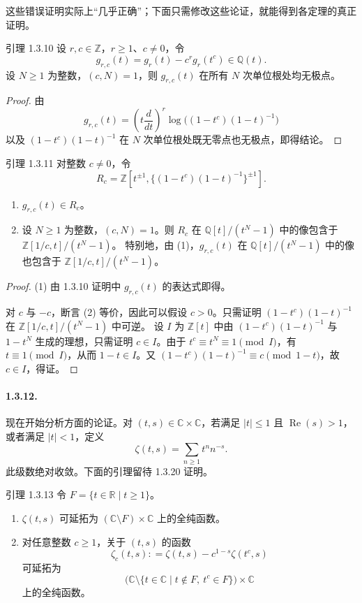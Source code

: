 这些错误证明实际上“几乎正确”；下面只需修改这些论证，就能得到各定理的真正证明。

\begin{statement}{引理 1.3.10}
设 $r,c\in\mathbb Z$，$r\geq1$、$c\ne0$，令
\[
g_{r,c}(t)=g_r(t)-c^rg_r(t^c)\in\mathbb Q(t).
\]
设 $N\geq1$ 为整数，$(c,N)=1$，则 $g_{r,c}(t)$ 在所有 $N$ 次单位根处均无极点。
\end{statement}
\begin{proof}
由
\[
g_{r,c}(t)=\left(t\frac d{dt}\right)^r
\log\bigl((1-t^c)(1-t)^{-1}\bigr)
\]
以及 $(1-t^c)(1-t)^{-1}$ 在 $N$ 次单位根处既无零点也无极点，即得结论。
\end{proof}

\begin{statement}{引理 1.3.11}
对整数 $c\ne0$，令
\[
R_c=\mathbb Z[t^{\pm1},\{(1-t^c)(1-t)^{-1}\}^{\pm1}].
\]
\begin{enumerate}[label=(\arabic*)]
\item $g_{r,c}(t)\in R_c$。
\item 设 $N\geq1$ 为整数，$(c,N)=1$。则 $R_c$ 在
$\mathbb Q[t]/(t^N-1)$ 中的像包含于 $\mathbb Z[1/c,t]/(t^N-1)$。
特别地，由 (1)，$g_{r,c}(t)$ 在 $\mathbb Q[t]/(t^N-1)$ 中的像也包含于
$\mathbb Z[1/c,t]/(t^N-1)$。
\end{enumerate}
\end{statement}
\begin{proof}
(1) 由 1.3.10 证明中 $g_{r,c}(t)$ 的表达式即得。

对 $c$ 与 $-c$，断言 (2) 等价，因此可以假设 $c>0$。只需证明
$(1-t^c)(1-t)^{-1}$ 在 $\mathbb Z[1/c,t]/(t^N-1)$ 中可逆。
设 $I$ 为 $\mathbb Z[t]$ 中由 $(1-t^c)(1-t)^{-1}$ 与 $1-t^N$ 生成的理想，只需证明 $c\in I$。由于 $t^c\equiv t^N\equiv1\pmod I$，有 $t\equiv1\pmod I$，从而 $1-t\in I$。又
$(1-t^c)(1-t)^{-1}\equiv c\pmod{1-t}$，故 $c\in I$，得证。
\end{proof}

\paragraph{1.3.12.}
现在开始分析方面的论证。对 $(t,s)\in\mathbb C\times\mathbb C$，若满足
$|t|\leq1$ 且 $\operatorname{Re}(s)>1$，或者满足 $|t|<1$，定义
\[
\zeta(t,s)=\sum_{n\geq1}t^nn^{-s}.
\]
此级数绝对收敛。下面的引理留待 1.3.20 证明。

\begin{statement}{引理 1.3.13}
令 $F=\{t\in\mathbb R\mid t\geq1\}$。
\begin{enumerate}[label=(\arabic*)]
\item $\zeta(t,s)$ 可延拓为 $(\mathbb C\setminus F)\times\mathbb C$ 上的全纯函数。
\item 对任意整数 $c\geq1$，关于 $(t,s)$ 的函数
\[
\zeta_c(t,s)\mathrel{\mathop:}=\zeta(t,s)-c^{1-s}\zeta(t^c,s)
\]
可延拓为
\[
\bigl(\mathbb C\setminus\{t\in\mathbb C\mid t\notin F,\ t^c\in F\}\bigr)\times\mathbb C
\]
上的全纯函数。
\end{enumerate}
\end{statement}

